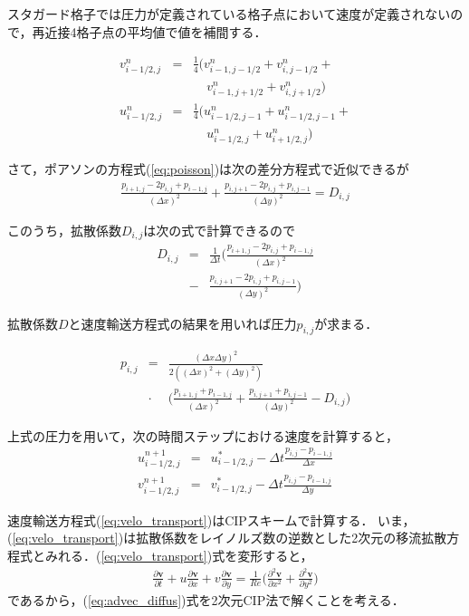 \documentclass[twocolumn,oneside,a4paper]{article}
\begin{document}
スタガード格子では圧力が定義されている格子点において速度が定義されないので，再近接4格子点の平均値で値を補間する．

\begin{eqnarray*}
 v^n_{i-1/2,j} &=& \frac{1}{4}\bigg(v^n_{i-1,j-1/2}+v^n_{i,j-1/2} +\\
               &&\:\:\:\:\: v^n_{i-1,j+1/2}+v^n_{i,j+1/2}\bigg) \\
 u^n_{i-1/2,j} &=& \frac{1}{4}\bigg(u^n_{i-1/2,j-1}+u^n_{i-1/2,j-1} +\\
               &&\:\:\:\:\: u^n_{i-1/2,j}+u^n_{i+1/2,j}\bigg)
\end{eqnarray*}


さて，ポアソンの方程式(\ref{eq:poisson})は次の差分方程式で近似できるが
\begin{eqnarray*}
	\frac{p_{i+1,j}-2p_{i,j}+p_{i-1,j}}{(\Delta x)^2} + \frac{p_{i,j+1}-2p_{i,j}+p_{i,j-1}}{(\Delta y)^2} = D_{i,j}
\end{eqnarray*}

このうち，拡散係数$D_{i,j}$は次の式で計算できるので
\begin{eqnarray*}
	D_{i,j} &=& \frac{1}{\Delta t}\bigg( \frac{p_{i+1,j}-2p_{i,j}+p_{i-1,j}}{(\Delta x)^2}  \\
	&-& \frac{p_{i,j+1}-2p_{i,j}+p_{i,j-1}}{(\Delta y)^2} \bigg)
\end{eqnarray*}

拡散係数$D$と速度輸送方程式の結果を用いれば圧力$p_{i,j}$が求まる．

\begin{eqnarray*}
	p_{i,j} &=& \frac{(\Delta x \Delta y)^2}{2((\Delta x)^2+(\Delta y)^2)} \\
	&\cdot& \bigg( \frac{p_{i+1,j}+p_{i-1,j}}{(\Delta x)^2} + \frac{p_{i,j+1}+p_{i,j-1}}{(\Delta y)^2} - D_{i,j}\bigg)
\end{eqnarray*}

上式の圧力を用いて，次の時間ステップにおける速度を計算すると，
\begin{eqnarray*}
	u^{n+1}_{i-1/2,j} &=& u^\ast_{i-1/2,j} - \Delta t \frac{p_{i,j}-p_{i-1,j}}{\Delta x} \\
	v^{n+1}_{i-1/2,j} &=& v^\ast_{i-1/2,j} - \Delta t \frac{p_{i,j}-p_{i-1,j}}{\Delta y} 
\end{eqnarray*}

速度輸送方程式(\ref{eq:velo_transport})はCIPスキームで計算する．
いま，(\ref{eq:velo_transport})は拡散係数をレイノルズ数の逆数とした2次元の移流拡散方程式とみれる．(\ref{eq:velo_transport})式を変形すると，
\begin{eqnarray}\label{eq:advec_diffus}
\frac{\partial \bm{v}}{\partial t} + u\frac{\partial \bm{v}}{\partial x} + v\frac{\partial \bm{v}}{\partial y} = \frac{1}{Re} \bigg( \frac{\partial^2 \bm{v}}{\partial x^2} + \frac{\partial^2 \bm{v}}{\partial y^2} \bigg)
\end{eqnarray}
であるから，(\ref{eq:advec_diffus})式を2次元CIP法で解くことを考える．
\end{document}
